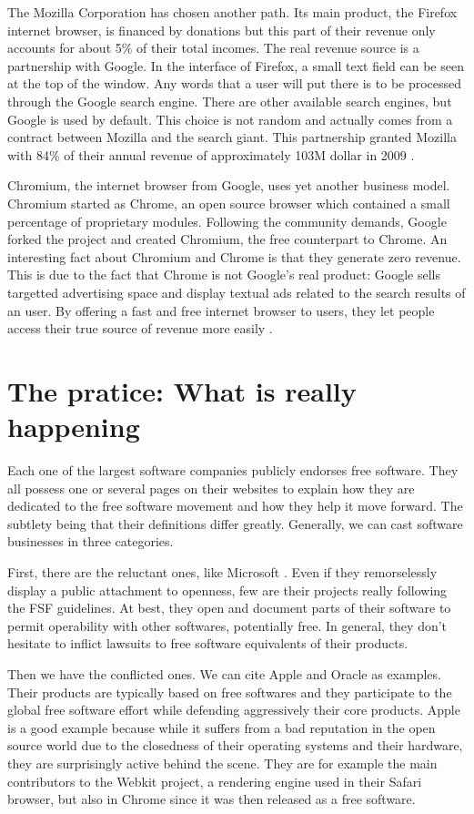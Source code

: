 \documentclass[12pt]{article}
\begin{document}
The Mozilla Corporation has chosen another path. Its main product, the
Firefox internet browser, is financed by donations but this part of
their revenue only accounts for about 5\% of their total incomes. The
real revenue source is a partnership with Google. In the interface of
Firefox, a small text field can be seen at the top of the window. Any
words that a user will put there is to be processed through the Google
search engine. There are other available search engines, but Google is
used by default. This choice is not random and actually comes from a
contract between Mozilla and the search giant. This partnership
granted Mozilla with 84\% of their annual revenue of approximately
103M dollar in 2009 \cite{moz}.

Chromium, the internet browser from Google, uses yet another business
model. Chromium started as Chrome, an open source browser which
contained a small percentage of proprietary modules. Following the
community demands, Google forked the project and created Chromium, the
free counterpart to Chrome. An interesting fact about Chromium and
Chrome is that they generate zero revenue. This is due to the fact
that Chrome is not Google's real product: Google sells targetted
advertising space and display textual ads related to the search
results of an user. By offering a fast and free internet browser to
users, they let people access their true source of revenue more easily
\cite{shuttle}.

\section{The pratice: What is really happening}

Each one of the largest software companies publicly endorses free
software. They all possess one or several pages on their websites to
explain how they are dedicated to the free software movement and how
they help it move forward. The subtlety being that their definitions
differ greatly. Generally, we can cast software businesses in three
categories.

First, there are the reluctant ones, like Microsoft \cite{woss}. Even
if they remorselessly display a public attachment to openness, few are
their projects really following the FSF guidelines. At best, they open
and document parts of their software to permit operability with other
softwares, potentially free. In general, they don't hesitate to
inflict lawsuits to free software equivalents of their products.

Then we have the conflicted ones. We can cite Apple and Oracle as
examples. Their products are typically based on free softwares and
they participate to the global free software effort while defending
aggressively their core products. Apple is a good example because
while it suffers from a bad reputation in the open source world due to
the closedness of their operating systems and their hardware, they are
surprisingly active behind the scene. They are for example the main
contributors to the Webkit project, a rendering engine used in their
Safari browser, but also in Chrome since it was then released as a
free software.
\end{document}
